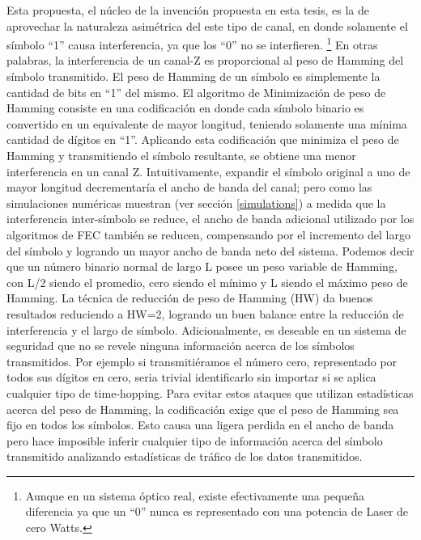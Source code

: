 Esta propuesta, el núcleo de la invención propuesta en esta tesis, es la de aprovechar la naturaleza asimétrica del este tipo de canal, en donde solamente el símbolo ``1'' causa interferencia, ya que los ``0'' no se interfieren. \footnote{Aunque en un sistema óptico real, existe efectivamente una pequeña diferencia ya que un ``0'' nunca es representado con una potencia de Laser de cero Watts.}
En otras palabras, la interferencia de un canal-Z es proporcional al peso de Hamming del símbolo transmitido.
El peso de Hamming de un símbolo es simplemente la cantidad de bits en ``1'' del mismo. El algoritmo de Minimización de peso de Hamming consiste en una codificación en donde cada símbolo binario es convertido en un equivalente de mayor longitud, teniendo solamente una mínima cantidad de dígitos en ``1''. Aplicando esta codificación que minimiza el peso de Hamming y transmitiendo el símbolo resultante, se obtiene una menor interferencia en un canal Z.
Intuitivamente, expandir el símbolo original a uno de mayor longitud decrementaría el ancho de banda del canal; pero como las simulaciones numéricas muestran (ver sección \ref{simulations}) a medida que la interferencia inter-símbolo se reduce, el ancho de banda adicional utilizado por los algoritmos de FEC también se reducen, compensando por el incremento del largo del símbolo y logrando un mayor ancho de banda neto del sistema.
Podemos decir que un número binario normal de largo L posee un peso variable de Hamming, con L/2 siendo el promedio, cero siendo el mínimo y L siendo el máximo peso de Hamming.
La técnica de reducción de peso de Hamming (HW) da buenos resultados reduciendo a HW=2, logrando un buen balance entre la reducción de interferencia y el largo de símbolo.
Adicionalmente, es deseable en un sistema de seguridad que no se revele ninguna información acerca de los símbolos transmitidos. Por ejemplo si transmitiéramos el número cero, representado por todos sus dígitos en cero, seria trivial identificarlo sin importar si se aplica cualquier tipo de time-hopping. Para evitar estos ataques que utilizan estadísticas acerca del peso de Hamming, la codificación exige que el peso de Hamming sea fijo en todos los símbolos. Esto causa una ligera perdida en el ancho de banda pero hace imposible inferir cualquier tipo de información acerca del símbolo transmitido analizando estadísticas de tráfico de los datos transmitidos.

